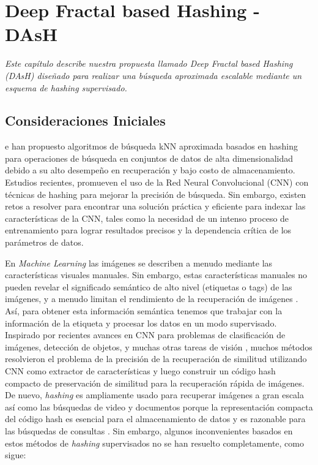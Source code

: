 \chapter{Deep Fractal based Hashing - DAsH}
 {\textit{Este capítulo describe nuestra propuesta llamado \textit{Deep Fractal based  Hashing} (DAsH) diseñado para realizar una búsqueda aproximada escalable mediante un esquema de \textit{hashing} supervisado. }}
 
 

\section{Consideraciones Iniciales}

e han propuesto   algoritmos de búsqueda  kNN aproximada basados en hashing para operaciones de búsqueda en conjuntos de datos de alta dimensionalidad debido a su alto desempeño  en  recuperación y bajo costo de almacenamiento. Estudios recientes, promueven el uso de la Red Neural Convolucional (CNN) con técnicas de hashing para mejorar la precisión de búsqueda. Sin embargo, existen retos a resolver para encontrar una solución práctica y eficiente para indexar las características de la CNN, tales como la necesidad de un intenso proceso de entrenamiento para lograr resultados precisos  y la dependencia crítica de los parámetros de datos. 


En \textit{Machine Learning} las imágenes se describen a menudo mediante las características visuales manuales.  Sin embargo, estas características manuales no pueden revelar el significado semántico de alto nivel (etiquetas o tags) de las imágenes, y a menudo limitan el rendimiento de la recuperación de imágenes \cite{Li:2015:RSS:2881665.2882186}. Así, para obtener esta información semántica tenemos que trabajar con la información de la etiqueta y procesar los datos en un modo supervisado. Inspirado por recientes avances en \acf{CNN} para problemas de clasificación de imágenes, detección de objetos, y muchas otras tareas de visión \cite{ImageNet,NIPS2013_5207,LiuWJJC12}, muchos métodos resolvieron el problema de la precisión de la recuperación de similitud utilizando CNN como extractor de características y luego construir un código hash compacto de preservación de similitud para la recuperación rápida de imágenes.   De nuevo, \textit{hashing} es ampliamente usado para recuperar imágenes a gran escala así como las búsquedas de video y documentos porque la representación compacta del código hash es esencial para el almacenamiento de datos y es razonable para las búsquedas de consultas \cite{conf/cvpr/ShenSLS15}.  Sin embargo, algunos inconvenientes basados en estos métodos de \textit{hashing} supervisados no se han resuelto completamente, como sigue:


